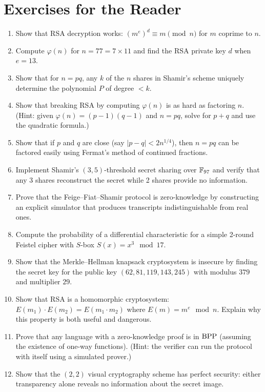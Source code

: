 \section*{Exercises for the Reader}

\begin{enumerate}
    \item [B] Show that RSA decryption works: $(m^e)^d \equiv m \pmod n$ for $m$ coprime to $n$.
    \item [B] Compute $\varphi(n)$ for $n = 77 = 7 \times 11$ and find the RSA private key $d$ when $e = 13$.
    \item [B] Show that for $n = pq$, any $k$ of the $n$ shares in Shamir's scheme uniquely determine the polynomial $P$ of degree $< k$.
    \item [I] Show that breaking RSA by computing $\varphi(n)$ is as hard as factoring $n$. (Hint: given $\varphi(n) = (p-1)(q-1)$ and $n = pq$, solve for $p + q$ and use the quadratic formula.)
    \item [I] Show that if $p$ and $q$ are close (say $|p - q| < 2n^{1/4}$), then $n = pq$ can be factored easily using Fermat's method of continued fractions.
    \item [I] Implement Shamir's $(3,5)$-threshold secret sharing over $\mathbb{F}_{97}$ and verify that any 3 shares reconstruct the secret while 2 shares provide no information.
    \item [A] Prove that the Feige--Fiat--Shamir protocol is zero-knowledge by constructing an explicit simulator that produces transcripts indistinguishable from real ones.
    \item [I] Compute the probability of a differential characteristic for a simple 2-round Feistel cipher with $S$-box $S(x) = x^3 \mod 17$.
    \item [B] Show that the Merkle--Hellman knapsack cryptosystem is insecure by finding the secret key for the public key $(62, 81, 119, 143, 245)$ with modulus $379$ and multiplier $29$.
    \item [I] Show that RSA is a homomorphic cryptosystem: $E(m_1) \cdot E(m_2) = E(m_1 \cdot m_2)$ where $E(m) = m^e \mod n$. Explain why this property is both useful and dangerous.
    \item [A] Prove that any language with a zero-knowledge proof is in $\operatorname{BPP}$ (assuming the existence of one-way functions). (Hint: the verifier can run the protocol with itself using a simulated prover.)
    \item [B] Show that the $(2,2)$ visual cryptography scheme has perfect security: either transparency alone reveals no information about the secret image.
\end{enumerate}

